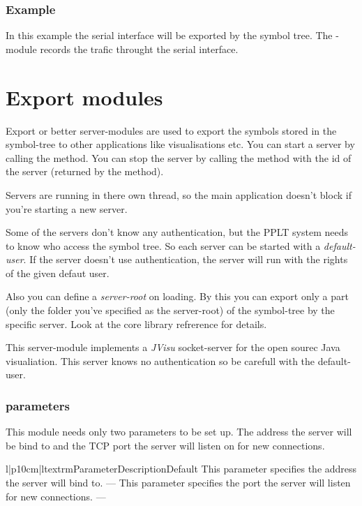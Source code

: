 {\subsubsection{Example}
In this example the serial interface will be exported by the symbol tree.
The -module records the trafic throught the serial 
interface.




\section{Export modules}
Export or better server-modules are used to export the symbols stored in the 
symbol-tree to other applications like visualisations etc. You can start a
server by calling the  method. You can stop the server
by calling the  method with the id of the server 
(returned by the  method). 

Servers are running in there own thread, so the main application doesn't block
if you're starting a new server. 

Some of the servers don't know any authentication, but the PPLT system needs 
to know who access the symbol tree. So each server can be started with a 
\emph{default-user}. If the server doesn't use authentication, the server 
will run with the rights of the given defaut user. 

Also you can define a \emph{server-root} on loading. By this you can export 
only a part (only the folder you've specified as the server-root) of the
symbol-tree by the specific server. Look at the core library refrerence for
details.


This server-module implements a \emph{JVisu} socket-server for the open
sourec Java visualiation. This server knows no authentication so be
carefull with the default-user.

\subsubsection{parameters}
This module needs only two parameters to be set up. The address the server
will be bind to and the TCP port the server will listen on for new 
connections.
\begin{tableiii}{l|p{10cm}|l}{textrm}{Parameter}{Description}{Default}
        {This parameter specifies the address the server will bind to.}
        {---}
        {This parameter specifies the port the server will listen for new
         connections.}
        {---}
\end{tableiii}



}
